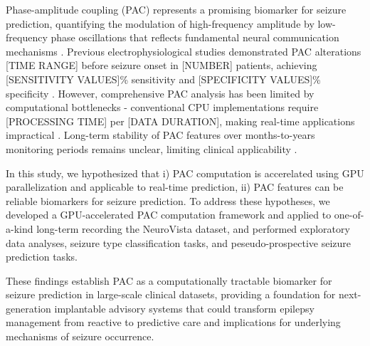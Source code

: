 Phase-amplitude coupling (PAC) represents a promising biomarker for seizure prediction, quantifying the modulation of high-frequency amplitude by low-frequency phase oscillations that reflects fundamental neural communication mechanisms \cite{Tort2010MeasuringPCE,Canolty2010TheFRC,Aru2014UntanglingCCD}. Previous electrophysiological studies demonstrated PAC alterations [TIME RANGE] before seizure onset in [NUMBER] patients, achieving [SENSITIVITY VALUES]\% sensitivity and [SPECIFICITY VALUES]\% specificity \cite{Kapoor2022EpilepticSPJ,Detti2020EEGSAC,Zhang2017TemporalspatialCOAG,Miao2021SeizureOZBG}. However, comprehensive PAC analysis has been limited by computational bottlenecks - conventional CPU implementations require [PROCESSING TIME] per [DATA DURATION], making real-time applications impractical \cite{Combrisson2020TensorpacAOAH,MartnezCancino2020ComputingPABK}. Long-term stability of PAC features over months-to-years monitoring periods remains unclear, limiting clinical applicability \cite{Rakowska2021LongTEQ}.

In this study, we hypothesized that i) PAC computation is accerelated using GPU parallelization and applicable to real-time prediction, ii) PAC features can be reliable biomarkers for seizure prediction. To address these hypotheses, we developed a GPU-accelerated PAC computation framework and applied to one-of-a-kind long-term recording the NeuroVista dataset, and performed exploratory data analyses, seizure type classification tasks, and peseudo-prospective seizure prediction tasks.

These findings establish PAC as a computationally tractable biomarker for seizure prediction in large-scale clinical datasets, providing a foundation for next-generation implantable advisory systems that could transform epilepsy management from reactive to predictive care and implications for underlying mechanisms of seizure occurrence.

\label{sec:introduction}

